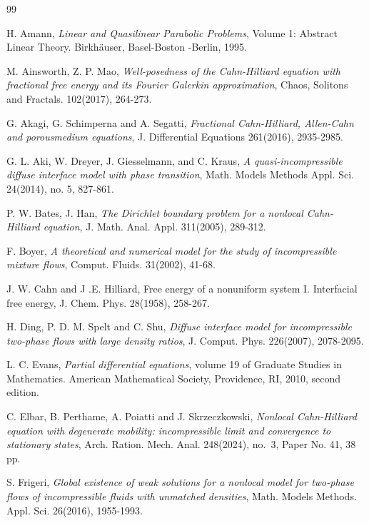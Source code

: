 \documentclass[reqno,a4paper,11pt]{amsart}
\theoremstyle{plain}
\numberwithin{equation}{section}
\begin{document}
\begin{thebibliography}{99}
	
	  H. Amann, \textit{Linear and Quasilinear Parabolic Problems}, Volume 1: Abstract
	Linear Theory. Birkh\"{a}user, Basel-Boston -Berlin, 1995.
	
	M. Ainsworth, Z. P. Mao, \textit{ Well-posedness of the Cahn-Hilliard equation with fractional free energy and its Fourier Galerkin approximation},
	Chaos, Solitons and Fractals. 102(2017), 264-273.
	
	G. Akagi, G. Schimperna and A. Segatti, \textit{ Fractional Cahn-Hilliard, Allen-Cahn and porousmedium equations},
	J. Differential Equations 261(2016), 2935-2985.
	
	 G. L. Aki, W. Dreyer, J. Giesselmann, and C. Kraus, \textit{ A quasi-incompressible diffuse interface model
		with phase transition}, Math. Models Methods Appl. Sci. 24(2014), no. 5, 827-861.
	
	P. W. Bates, J. Han, \textit{ The Dirichlet boundary problem for a nonlocal Cahn-Hilliard equation},
	J. Math. Anal. Appl. 311(2005), 289-312.
	
	 F. Boyer, \textit{A theoretical and numerical model for the study of incompressible mixture
		flows}, Comput. Fluids. 31(2002), 41-68.
	
	 J. W. Cahn and J .E. Hilliard, Free energy of a nonuniform system I. Interfacial free energy, J. Chem. Phys. 28(1958), 258-267.
	
	
	
	  H. Ding, P. D. M. Spelt and C. Shu, \textit{Diffuse interface model for incompressible two-phase flows with large density ratios},  J. Comput. Phys. 226(2007), 2078-2095.
	
	L. C. Evans, \textit{Partial differential equations}, volume 19 of Graduate Studies in Mathematics. American Mathematical Society, Providence, RI, 2010, second edition.
	
	 C. Elbar, B. Perthame, A. Poiatti and J. Skrzeczkowski, \textit{Nonlocal Cahn-Hilliard equation with degenerate mobility: incompressible limit and convergence to stationary states}, Arch. Ration. Mech. Anal. 248(2024), no.~3, Paper No. 41, 38 pp.
	
	S. Frigeri, \textit{Global existence of weak solutions for a nonlocal model for two-phase flows of incompressible fluids with unmatched densities}, Math. Models Methods. Appl. Sci. 26(2016), 1955-1993.
	

\end{thebibliography}
\end{document}
